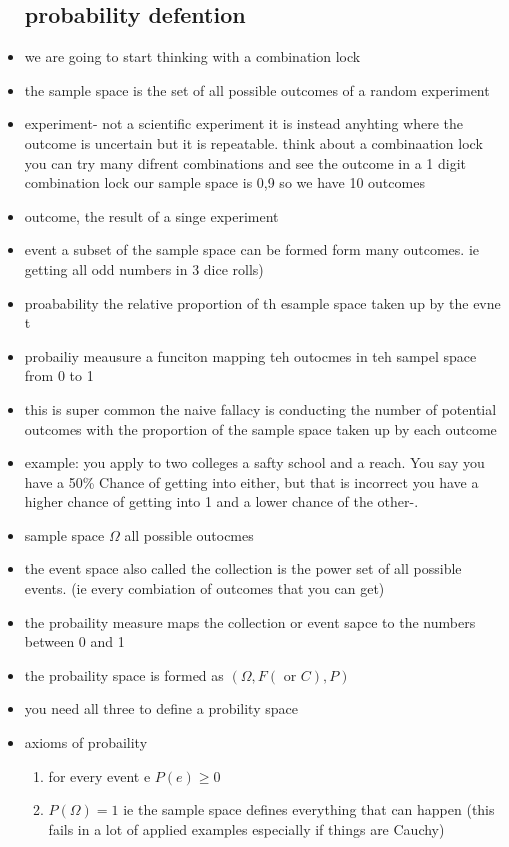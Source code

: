 \documentclass{article}
\begin{document}
\begin{itemize}
\subsection{probability defention}
\item we are going to start thinking with a combination lock 
\item the sample space is the set of all possible outcomes of a random experiment 
\item experiment- not a scientific experiment it is instead anyhting where the outcome is uncertain but it is repeatable. think about a combinaation lock you can try many difrent combinations and see the outcome 
\itme in a 1 digit combination lock our sample space is 0,9 so we have 10 outcomes
\item outcome, the result of a singe experiment 
\item event a subset of the sample space can be formed form many outcomes. ie getting all odd numbers in 3 dice rolls) 
\item proabability the relative proportion of th esample space taken up by the evne t
\item probailiy meausure a funciton mapping teh outocmes in teh sampel space from 0 to  1
\item this is super common 
\itme the naive fallacy is conducting the number of potential outcomes with the proportion of the sample space taken up by each outcome 
\item example: you apply to two colleges a safty school and a reach. You say you have a 50\% Chance of getting into either, but that is incorrect you have a higher chance of getting into 1 and a lower chance of the other-. 
\item sample space $\Omega$ all possible outocmes 
\item the event space also called the collection is the power set of all possible events. (ie every combiation of outcomes that you can get)
\item the probaility measure maps the collection or event sapce to the numbers between 0 and 1 
\item the probaility space is formed as $(\Omega, F(\text{ or }C), P)$
\item you need all three to define a probility space
\item axioms of probaility
\begin{enumerate}
    \item for every event e $P(e)\geq 0$
    \item $P(\Omega)=1$ ie the sample space defines everything that can happen (this fails in a lot of applied examples especially if things are Cauchy) 

\end{enumerate}
\end{itemize}
\end{document}
